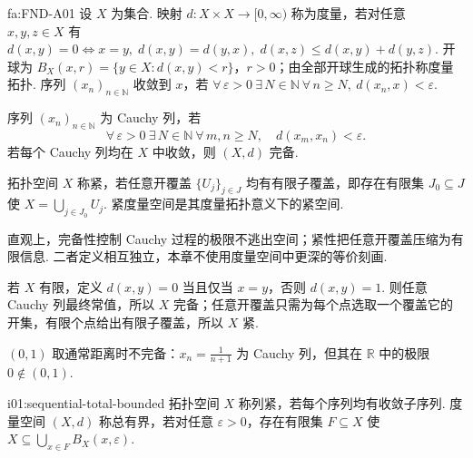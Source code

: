 \begin{FADefinition}[A][度量、完备与紧性]{fa:FND-A01}
设 \(\displaystyle X\) 为集合. 映射 \(\displaystyle d:X\times X\to[0,\infty)\) 称为度量，若对任意 \(\displaystyle x,y,z\in X\) 有 \(\displaystyle d(x,y)=0\iff x=y, \; d(x,y)=d(y,x), \; d(x,z)\leqslant d(x,y)+d(y,z)\).
开球为 \(\displaystyle B_X(x,r)=\{y\in X:d(x,y)<r\}\)，\(\displaystyle r>0\)；由全部开球生成的拓扑称度量拓扑. 序列 \(\displaystyle (x_n)_{n\in\mathbb N}\) 收敛到 \(\displaystyle x\)，若 \(\displaystyle \forall\,\varepsilon>0\ \exists\,N\in\mathbb N\ \forall\,n\geqslant N,\ d(x_n,x)<\varepsilon\).

序列 \(\displaystyle (x_n)_{n\in\mathbb N}\) 为 Cauchy 列，若
\[
\forall\,\varepsilon>0\ \exists\,N\in\mathbb N\ \forall\,m,n\geqslant N,
\quad d(x_m,x_n)<\varepsilon.
\]
若每个 Cauchy 列均在 \(\displaystyle X\) 中收敛，则 \(\displaystyle (X,d)\) 完备.

拓扑空间 \(\displaystyle X\) 称紧，若任意开覆盖 \(\displaystyle \{U_j\}_{j\in J}\) 均有有限子覆盖，即存在有限集 \(\displaystyle J_0\subseteq J\) 使 \(\displaystyle X=\bigcup_{j\in J_0}U_j\).
紧度量空间是其度量拓扑意义下的紧空间.
\end{FADefinition}

直观上，完备性控制 Cauchy 过程的极限不逃出空间；紧性把任意开覆盖压缩为有限信息. 二者定义相互独立，本章不使用度量空间中更深的等价刻画.

\begin{FAExample}[有限离散空间]
若 \(\displaystyle X\) 有限，定义 \(\displaystyle d(x,y)=0\) 当且仅当 \(\displaystyle x=y\)，否则 \(\displaystyle d(x,y)=1\). 则任意 Cauchy 列最终常值，所以 \(\displaystyle X\) 完备；任意开覆盖只需为每个点选取一个覆盖它的开集，有限个点给出有限子覆盖，所以 \(\displaystyle X\) 紧.
\end{FAExample}

\begin{FACounterexample}[删除完备性]
\(\displaystyle (0,1)\) 取通常距离时不完备：\(\displaystyle x_n=\frac{1}{n+1}\) 为 Cauchy 列，但其在 \(\displaystyle \mathbb R\) 中的极限 \(\displaystyle 0\notin(0,1)\).
\end{FACounterexample}

\begin{FADefinition}[C][列紧与总有界]{i01:sequential-total-bounded}
拓扑空间 \(\displaystyle X\) 称列紧，若每个序列均有收敛子序列. 度量空间 \(\displaystyle (X,d)\) 称总有界，若对任意 \(\displaystyle \varepsilon>0\)，存在有限集 \(\displaystyle F\subseteq X\) 使 \(\displaystyle X\subseteq\bigcup_{x\in F}B_X(x,\varepsilon)\).
\end{FADefinition}

